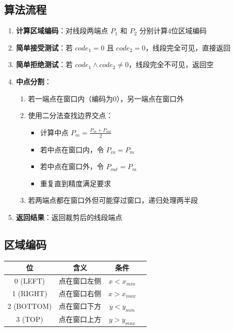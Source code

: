 \documentclass[12pt,a4paper]{article}
\begin{document}
\subsection{算法流程}
\begin{enumerate}
    \item \textbf{计算区域编码}：对线段两端点 $P_1$ 和 $P_2$ 分别计算4位区域编码
    \item \textbf{简单接受测试}：若 $code_1 = 0$ 且 $code_2 = 0$，线段完全可见，直接返回
    \item \textbf{简单拒绝测试}：若 $code_1 \land code_2 \neq 0$，线段完全不可见，返回空
    \item \textbf{中点分割}：
    \begin{enumerate}
        \item 若一端点在窗口内（编码为0），另一端点在窗口外
        \item 使用二分法查找边界交点：
        \begin{itemize}
            \item 计算中点 $P_m = \frac{P_{in} + P_{out}}{2}$
            \item 若中点在窗口内，令 $P_{in} = P_m$
            \item 若中点在窗口外，令 $P_{out} = P_m$
            \item 重复直到精度满足要求
        \end{itemize}
        \item 若两端点都在窗口外但可能穿过窗口，递归处理两半段
    \end{enumerate}
    \item \textbf{返回结果}：返回裁剪后的线段端点
\end{enumerate}

\subsection{区域编码}
\begin{center}
\begin{tabular}{|c|c|c|c|}
\hline
位 & 含义 & 条件 \\
\hline
0 (LEFT) & 点在窗口左侧 & $x < x_{min}$ \\
1 (RIGHT) & 点在窗口右侧 & $x > x_{max}$ \\
2 (BOTTOM) & 点在窗口下方 & $y < y_{min}$ \\
3 (TOP) & 点在窗口上方 & $y > y_{max}$ \\
\hline
\end{tabular}
\end{center}
\end{document}
